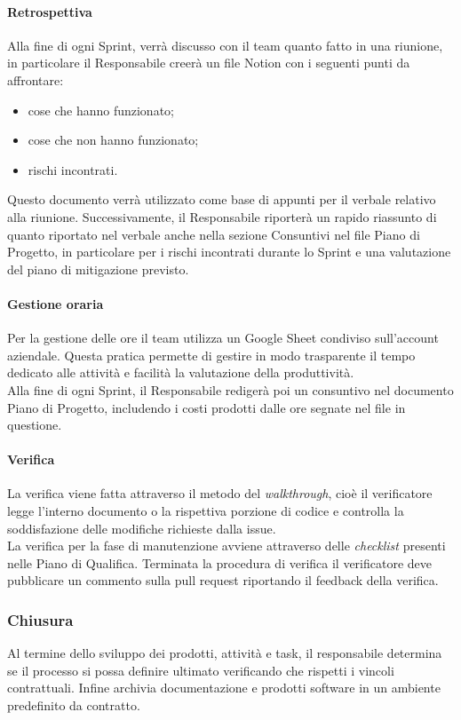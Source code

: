     \paragraph{Retrospettiva} \label{sec:val-retrospettiva}
        Alla fine di ogni Sprint, verrà discusso con il team quanto fatto in una riunione, in particolare il Responsabile creerà un file Notion con i seguenti punti da affrontare:
        \begin{itemize}
            \item cose che hanno funzionato;
            \item cose che non hanno funzionato;
            \item rischi incontrati.
        \end{itemize}

        Questo documento verrà utilizzato come base di appunti per il verbale relativo alla riunione.
        Successivamente, il Responsabile riporterà un rapido riassunto di quanto riportato nel verbale anche nella sezione Consuntivi nel file Piano di Progetto, in particolare per i rischi incontrati durante lo Sprint e una valutazione del piano di mitigazione previsto.

        \paragraph{Gestione oraria}
        Per la gestione delle ore il team utilizza un Google Sheet condiviso sull'account aziendale. Questa pratica permette di gestire in modo trasparente il tempo dedicato alle attività e facilità la valutazione della produttività.\\
        Alla fine di ogni Sprint, il Responsabile redigerà poi un consuntivo nel documento Piano di Progetto, includendo i costi prodotti dalle ore segnate nel file in questione.

        \paragraph{Verifica} \label{sec:pian-verifica}
        La verifica viene fatta attraverso il metodo del \emph{walkthrough}, cioè il verificatore legge l'interno documento o la rispettiva porzione di codice e controlla la soddisfazione delle modifiche richieste dalla issue.\\
        La verifica per la fase di manutenzione avviene attraverso delle \emph{checklist} presenti nelle Piano di Qualifica. Terminata la procedura di verifica il verificatore deve pubblicare un commento sulla pull request riportando il feedback della verifica.
            
    \subsubsection{Chiusura}\label{sec:closure}
        Al termine dello sviluppo dei prodotti, attivit\`a e task, il responsabile determina se il processo si possa definire ultimato verificando che rispetti i vincoli contrattuali. Infine archivia documentazione e prodotti software in un ambiente predefinito da contratto.
        
        